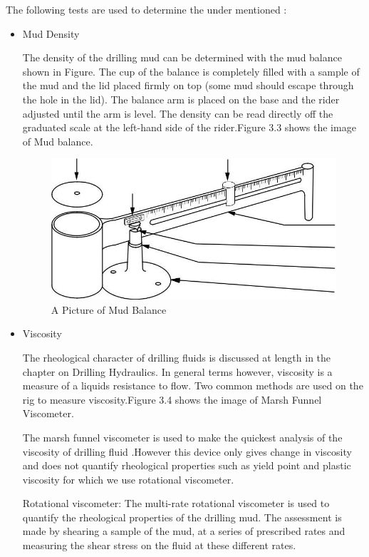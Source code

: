 The following tests are used to determine the under mentioned :
\begin{itemize}

\item Mud Density

The density of the drilling mud can be determined with the mud balance shown 
in Figure. The cup of the balance is completely filled with a sample of the
mud and the lid placed firmly on top (some mud should escape through the hole 
in the lid). The balance arm is placed on the base and the rider adjusted until 
the arm is level. The density can be read directly off the graduated scale at 
the left-hand side of the rider.Figure 3.3 shows the image of Mud balance.


\begin{figure}[h]
\includegraphics[scale=0.3]{images/mudbalance}
\centering 
\caption{A Picture of Mud Balance}
\end{figure}

\item Viscosity

The rheological character of drilling fluids is discussed at length in the 
chapter on Drilling Hydraulics. In general terms however, viscosity is a 
measure of a liquids resistance to flow. Two common methods are used on the rig 
to measure viscosity.Figure 3.4 shows the image of Marsh Funnel Viscometer.

The marsh funnel viscometer is used to make the quickest analysis of the 
viscosity of drilling fluid .However this device only gives change in 
viscosity and does not quantify rheological properties such as yield point 
and plastic viscosity for which we use rotational viscometer.

Rotational viscometer: The multi-rate rotational viscometer is used
to quantify the rheological properties of the drilling mud. The
assessment is made by shearing a sample of the mud, at a series of
prescribed rates and measuring the shear stress on the fluid at these
different rates.


\end{itemize}
